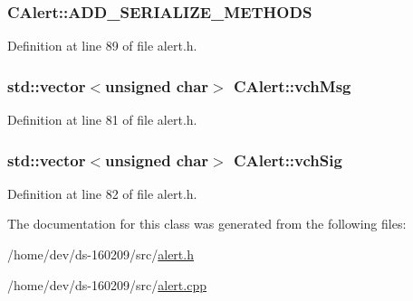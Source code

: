 \subsubsection[{A\+D\+D\+\_\+\+S\+E\+R\+I\+A\+L\+I\+Z\+E\+\_\+\+M\+E\+T\+H\+O\+D\+S}]{\setlength{\rightskip}{0pt plus 5cm}C\+Alert\+::\+A\+D\+D\+\_\+\+S\+E\+R\+I\+A\+L\+I\+Z\+E\+\_\+\+M\+E\+T\+H\+O\+D\+S}\label{class_c_alert_aca9310112e67fb38ef88f385a4ac6fc0}


Definition at line 89 of file alert.\+h.

\hypertarget{class_c_alert_abfcb3b339d052cd3dd6670b03286758a}{}
\subsubsection[{vch\+Msg}]{\setlength{\rightskip}{0pt plus 5cm}std\+::vector$<$unsigned char$>$ C\+Alert\+::vch\+Msg}\label{class_c_alert_abfcb3b339d052cd3dd6670b03286758a}


Definition at line 81 of file alert.\+h.

\hypertarget{class_c_alert_a541b49670ebf387a5f8b7de59277fed0}{}
\subsubsection[{vch\+Sig}]{\setlength{\rightskip}{0pt plus 5cm}std\+::vector$<$unsigned char$>$ C\+Alert\+::vch\+Sig}\label{class_c_alert_a541b49670ebf387a5f8b7de59277fed0}


Definition at line 82 of file alert.\+h.



The documentation for this class was generated from the following files\+:\begin{DoxyCompactItemize}
\item 
/home/dev/ds-\/160209/src/\hyperlink{alert_8h}{alert.\+h}\item 
/home/dev/ds-\/160209/src/\hyperlink{alert_8cpp}{alert.\+cpp}\end{DoxyCompactItemize}

